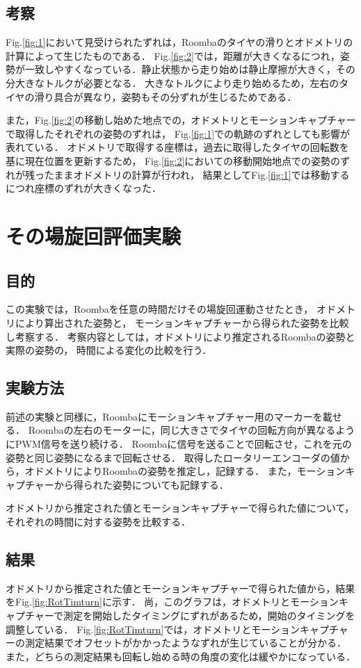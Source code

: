 \documentclass[a4paper,11pt]{jsarticle}
\begin{document}
\subsection{考察}
Fig.{\ref{fig:1}}において見受けられたずれは，Roombaのタイヤの滑りとオドメトリの計算によって生じたものである．
Fig.{\ref{fig:2}}では，距離が大きくなるにつれ，姿勢が一致しやすくなっている．静止状態から走り始めは静止摩擦が大きく，その分大きなトルクが必要となる．
大きなトルクにより走り始めるため，左右のタイヤの滑り具合が異なり，姿勢もその分ずれが生じるためである．\par
また，Fig.{\ref{fig:2}}の移動し始めた地点での，オドメトリとモーションキャプチャーで取得したそれぞれの姿勢のずれは，
Fig.{\ref{fig:1}}での軌跡のずれとしても影響が表れている．
オドメトリで取得する座標は，過去に取得したタイヤの回転数を基に現在位置を更新するため，
Fig.{\ref{fig:2}}においての移動開始地点での姿勢のずれが残ったままオドメトリの計算が行われ，
結果としてFig.{\ref{fig:1}}では移動するにつれ座標のずれが大きくなった．


\section{\label{experi}その場旋回評価実験}

\subsection{目的}
この実験では，Roombaを任意の時間だけその場旋回運動させたとき，
オドメトリにより算出された姿勢と，
モーションキャプチャーから得られた姿勢を比較し考察する．
考察内容としては，オドメトリにより推定されるRoombaの姿勢と実際の姿勢の，
時間による変化の比較を行う．

\subsection{実験方法}
前述の実験と同様に，Roombaにモーションキャプチャー用のマーカーを載せる．
Roombaの左右のモーターに，同じ大きさでタイヤの回転方向が異なるようにPWM信号を送り続ける．
Roombaに信号を送ることで回転させ，これを元の姿勢と同じ姿勢になるまで回転させる．
取得したロータリーエンコーダの値から，オドメトリによりRoombaの姿勢を推定し，記録する．
また，モーションキャプチャーから得られた姿勢についても記録する．\par
オドメトリから推定された値とモーションキャプチャーで得られた値について，
それぞれの時間に対する姿勢を比較する．

\subsection{結果}
オドメトリから推定された値とモーションキャプチャーで得られた値から，結果をFig.{\ref{fig:RotTimturn}}に示す．
尚，このグラフは，オドメトリとモーションキャプチャーで測定を開始したタイミングにずれがあるため，開始のタイミングを調整している．
Fig.{\ref{fig:RotTimturn}}では，オドメトリとモーションキャプチャーの測定結果でオフセットがかかったようなずれが生じていることが分かる．
また，どちらの測定結果も回転し始める時の角度の変化は緩やかになっている．
\end{document}
